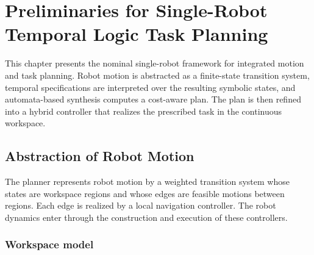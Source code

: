 \chapter{Preliminaries for Single-Robot Temporal Logic Task Planning}
\label{chap:preliminaries}

This chapter presents the nominal single-robot framework for integrated motion
and task planning. Robot motion is abstracted as a finite-state transition
system, temporal specifications are interpreted over the resulting symbolic
states, and automata-based synthesis computes a cost-aware plan. The plan is
then refined into a hybrid controller that realizes the prescribed task in the
continuous workspace.


\section{Abstraction of Robot Motion}
\label{ch02:sec:system_abstraction_task_specification}

\begin{revision}
The planner represents robot motion by a weighted transition system whose
states are workspace regions and whose edges are feasible motions between regions.
Each edge is realized by a local navigation controller. The robot dynamics enter
through the construction and execution of these controllers.
\end{revision}

\subsection{Workspace model}
\label{ch02:subsec:workspacemodel}

